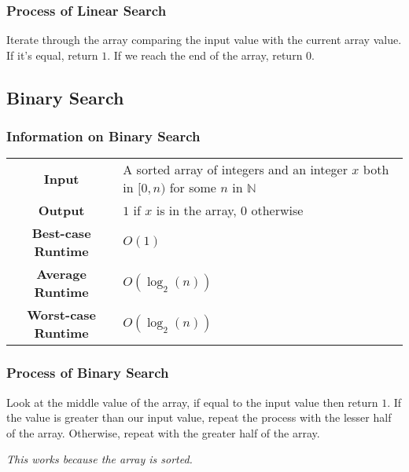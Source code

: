 \documentclass[a4paper, 12pt, twoside]{article}
\begin{document}
\subsubsection{Process of Linear Search}

Iterate through the array comparing the input value with the current
array value. If it's equal, return $1$. If we reach the end of the
array, return $0$.

\subsection{Binary Search}

\subsubsection{Information on Binary Search}

\begin{center}
      \begin{tabular}{ || c | p{8.5cm} || }
            \hline
                  \textbf{Input} & A sorted array of integers and 
                        an integer $x$ both in $[0, n)$ for some $n$
                        in $\mathbb{N}$ \\
                  \textbf{Output} & $1$ if $x$ is in the array, $0$
                        otherwise \\
            \hline\hline
                  \textbf{Best-case Runtime} & $O(1)$ \\
                  \textbf{Average Runtime} & $O(\log_2(n))$ \\
                  \textbf{Worst-case Runtime} & $O(\log_2(n))$ \\
            \hline
      \end{tabular}
\end{center}

\subsubsection{Process of Binary Search}

Look at the middle value of the array, if equal to the input value
then return $1$. If the value is greater than our input value, repeat
the process with the lesser half of the array. Otherwise, repeat with
the greater half of the array.

\vspace{\baselineskip}

\textit{This works because the array is sorted.}
\end{document}
